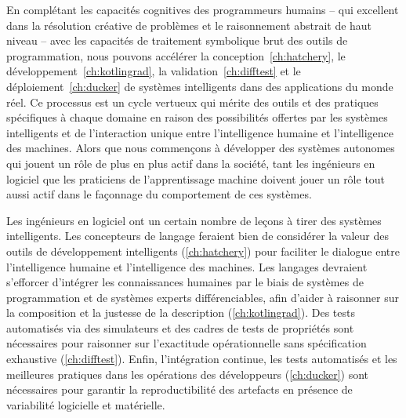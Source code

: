 En complétant les capacités cognitives des programmeurs humains -- qui excellent dans la résolution créative de problèmes et le raisonnement abstrait de haut niveau -- avec les capacités de traitement symbolique brut des outils de programmation, nous pouvons accélérer la conception~\autoref{ch:hatchery}, le développement~\autoref{ch:kotlingrad}, la validation~\autoref{ch:difftest} et le déploiement~\autoref{ch:ducker} de systèmes intelligents dans des applications du monde réel. Ce processus est un cycle vertueux qui mérite des outils et des pratiques spécifiques à chaque domaine en raison des possibilités offertes par les systèmes intelligents et de l'interaction unique entre l'intelligence humaine et l'intelligence des machines. Alors que nous commençons à développer des systèmes autonomes qui jouent un rôle de plus en plus actif dans la société, tant les ingénieurs en logiciel que les praticiens de l'apprentissage machine doivent jouer un rôle tout aussi actif dans le façonnage du comportement de ces systèmes.

Les ingénieurs en logiciel ont un certain nombre de leçons à tirer des systèmes intelligents. Les concepteurs de langage feraient bien de considérer la valeur des outils de développement intelligents (\autoref{ch:hatchery}) pour faciliter le dialogue entre l'intelligence humaine et l'intelligence des machines. Les langages devraient s'efforcer d'intégrer les connaissances humaines par le biais de systèmes de programmation et de systèmes experts différenciables, afin d'aider à raisonner sur la composition et la justesse de la description (\autoref{ch:kotlingrad}). Des tests automatisés via des simulateurs et des cadres de tests de propriétés sont nécessaires pour raisonner sur l'exactitude opérationnelle sans spécification exhaustive (\autoref{ch:difftest}). Enfin, l'intégration continue, les tests automatisés et les meilleures pratiques dans les opérations des développeurs (\autoref{ch:ducker}) sont nécessaires pour garantir la reproductibilité des artefacts en présence de variabilité logicielle et matérielle.

